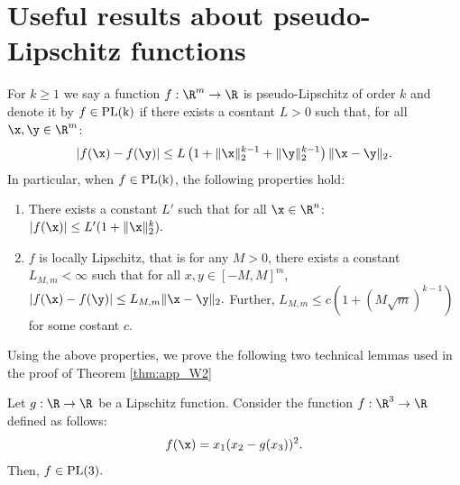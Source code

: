 





\section{Useful results about pseudo-Lipschitz functions}\label{SM useful fact}
For $k\geq 1$ we say a function $f:\R^m\rightarrow\R$ is pseudo-Lipschitz of order $k$ and denote it by $f\in \rm{PL}(k)$ if there exists a cosntant $L>0$ such that, for all $\x,\y\in\R^m$:
\begin{align}
|f(\x)-f(\y)|\leq L\left(1+\|\x\|_2^{k-1}+\|\y\|_2^{k-1}\right)\|\x-\y\|_2.\label{PL func}
\end{align}
In particular, when $f\in\rm{PL}(k)$, the following properties hold:
\begin{enumerate}
\item There exists a constant $L'$ such that for all $\x\in\R^n$: $|f(\x)|\leq L'(1+\|\x\|_2^k).$

\item $f$ is locally Lipschitz, that is for any $M>0$, there exists a constant $L_{M,m}<\infty$ such that for all $x,y\in[-M,M]^m$,
$
|f(\x)-f(\y)| \leq L_{M,m}\|\x-\y\|_2.
$
Further, $L_{M,m}\leq c(1+(M\sqrt{m})^{k-1})$ for some costant $c$.
\end{enumerate}

Using the above properties, we prove the following two technical lemmas used in the proof of Theorem \ref{thm:app_W2}

\begin{lemma}\label{lem:fL}
Let $g:\R\rightarrow\R$ be a Lipschitz function. Consider the function $f:\R^3\rightarrow\R$ defined as follows:
$$
f(\x) = x_1(x_2-g(x_3))^2.
$$
Then, $f\in\rm{PL}(3).$
\end{lemma}

